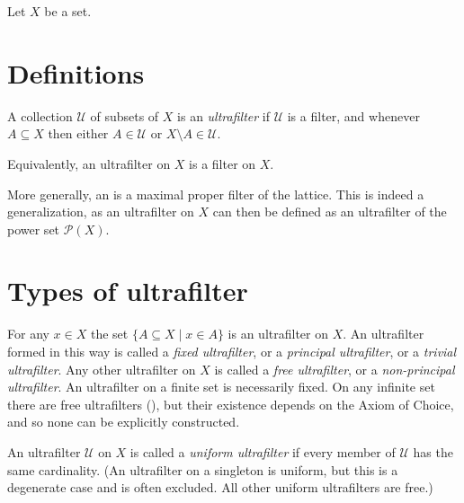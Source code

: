 \documentclass{article}
\begin{document}

Let $X$ be a set.

\section*{Definitions}

A collection $\mathcal{U}$ of subsets of $X$ is an \emph{ultrafilter} if $\mathcal{U}$ is a filter, and whenever $A\subseteq X$ then either $A\in\mathcal{U}$ or $X\setminus A\in\mathcal{U}$.

Equivalently, an ultrafilter on $X$ is a  filter on $X$.

More generally, an 
is a maximal proper filter of the lattice.
This is indeed a generalization, as an ultrafilter on $X$
can then be defined as an ultrafilter of the power set $\mathcal{P}(X)$.

\section*{Types of ultrafilter}

For any $x\in X$ the set $\{A\subseteq X\mid x\in A\}$ is an ultrafilter on $X$.
An ultrafilter formed in this way is called a \emph{fixed ultrafilter},
or a \emph{principal ultrafilter}, or a \emph{trivial ultrafilter}.
Any other ultrafilter on $X$ is called a \emph{free ultrafilter},
or a \emph{non-principal ultrafilter}.
An ultrafilter on a finite set is necessarily fixed.
On any infinite set there are free ultrafilters
(),
but their existence depends on the Axiom of Choice,
and so none can be explicitly constructed.

An ultrafilter $\mathcal{U}$ on $X$ is called a \emph{uniform ultrafilter}
if every member of $\mathcal{U}$ has the same cardinality.
(An ultrafilter on a singleton is uniform,
but this is a degenerate case and is often excluded.
All other uniform ultrafilters are free.)
\end{document}
